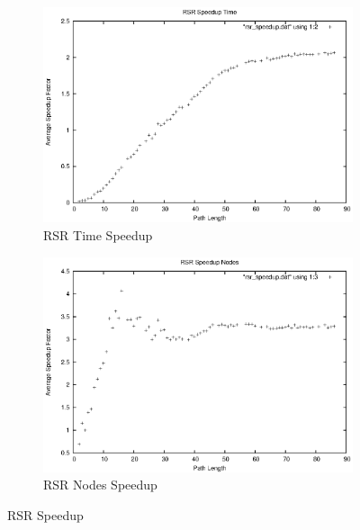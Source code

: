 \documentclass[12pt]{article}
\begin{document}
\begin{figure}
  \begin{subfigure}[b]{.5\linewidth}
    \includegraphics[scale=0.6]{figures/rsr_speedup_time.eps}
    \caption{RSR Time Speedup}\label{rsr_speedup:time}
  \end{subfigure}
  \begin{subfigure}[b]{.5\linewidth}
    \includegraphics[scale=0.6]{figures/rsr_speedup_nodes.eps}
    \caption{RSR Nodes Speedup}\label{rsr_speedup:nodes}
  \end{subfigure}
  \caption{RSR Speedup}\label{rsr_speedup}
\end{figure}
\end{document}
